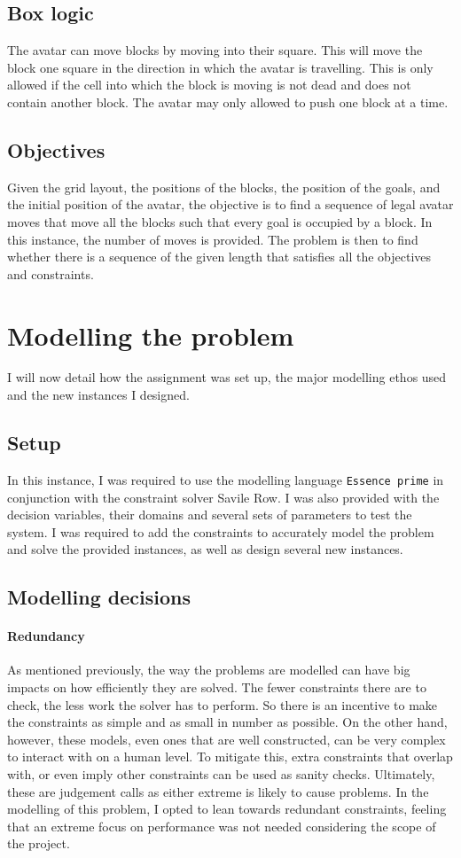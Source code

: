 \documentclass[british]{article}
\newcommand{\code}[1]{\texttt{#1}}
\begin{document}
	
	\subsection{Box logic}
	The avatar can move blocks by moving into their square. This will move the block one square in the direction in which the avatar is travelling. This is only allowed if the cell into which the block is moving is not dead and does not contain another block. The avatar may only allowed to push one block at a time.
	
	\subsection{Objectives}
	Given the grid layout, the positions of the blocks, the position of the goals, and the initial position of the avatar, the objective is to find a sequence of legal avatar moves that move all the blocks such that every goal is occupied by a block. In this instance, the number of moves is provided. The problem is then to find whether there is a sequence of the given length that satisfies all the objectives and constraints. 
	
	
	\section{Modelling the problem}
	I will now detail how the assignment was set up, the major modelling ethos used and the new instances I designed. 
	\label{model}
	\subsection{Setup}
	In this instance, I was required to use the modelling language \code{Essence prime} in conjunction with the constraint solver Savile Row. I was also provided with the decision variables, their domains and several sets of parameters to test the system. I was required to add the constraints to accurately model the problem and solve the provided instances, as well as design several new instances. 
	
	\subsection{Modelling decisions}
	\paragraph{Redundancy}
	As mentioned previously, the way the problems are modelled can have big impacts on how efficiently they are solved. The fewer constraints there are to check, the less work the solver has to perform. So there is an incentive to make the constraints as simple and as small in number as possible. On the other hand, however, these models, even ones that are well constructed, can be very complex to interact with on a human level. To mitigate this, extra constraints that overlap with, or even imply other constraints can be used as sanity checks. Ultimately, these are judgement calls as either extreme is likely to cause problems. In the modelling of this problem, I opted to lean towards redundant constraints, feeling that an extreme focus on performance was not needed considering the scope of the project. 
	
\end{document}
